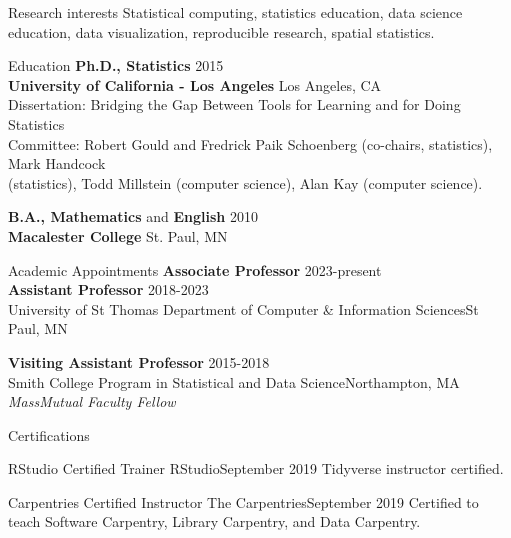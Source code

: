 \documentclass{resume} %
\begin{document}
\begin{rSection}{Research interests}
Statistical computing, statistics education, data science education, data visualization, reproducible research, spatial statistics. 
\end{rSection}


\begin{rSection}{Education}
{\bf Ph.D., Statistics} \hfill 2015\\ 
{\bf University of California - Los Angeles} \hfill Los Angeles, CA \\
{Dissertation: Bridging the Gap Between Tools for Learning and for Doing Statistics} \\
{Committee: Robert Gould and Fredrick Paik Schoenberg (co-chairs, statistics), Mark Handcock \\(statistics), Todd Millstein (computer science), Alan Kay (computer science).} \smallskip 

{\bf B.A., Mathematics} and {\bf English}  \hfill  2010 \\
{\bf Macalester College} \hfill St. Paul, MN\smallskip 
\end{rSection}



\begin{rSection}{Academic Appointments}
{\bf Associate Professor} \hfill {2023-present} \\
{\bf Assistant Professor} \hfill {2018-2023} \\
{University of St Thomas Department of Computer \& Information Sciences}\hfill {St Paul, MN} 

{\bf Visiting Assistant Professor} \hfill {2015-2018} \\
{Smith College Program in Statistical and Data Science}\hfill {Northampton, MA} \\
\emph{MassMutual Faculty Fellow} 
\end{rSection}

\begin{rSection}{Certifications}
\begin{reSubsection}{RStudio Certified Trainer}{ RStudio}{September 2019}
{}{Tidyverse instructor certified.}
\end{reSubsection}
\begin{reSubsection}{Carpentries Certified Instructor}{ The Carpentries}{September 2019}
{}{Certified to teach Software Carpentry, Library Carpentry, and Data Carpentry.}
\end{reSubsection}
\end{rSection}
\end{document}
